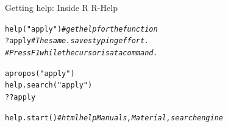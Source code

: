 \documentclass[xcolor=table,       handout,    xcolor=dvipsnames]{beamer}\usepackage[]{graphicx}\usepackage[]{color}
\makeatletter
\newcommand{\hlstr}[1]{\textcolor[rgb]{0.545,0.137,0.137}{#1}}
\newcommand{\hlcom}[1]{\textcolor[rgb]{0,0.392,0}{\textit{#1}}}
\newcommand{\hlopt}[1]{\textcolor[rgb]{0,0,0}{#1}}
\newcommand{\hlstd}[1]{\textcolor[rgb]{0,0,0}{#1}}
\newcommand{\hlkwd}[1]{\textcolor[rgb]{0,0,1}{#1}}
\newenvironment{kframe}{%
 \def\at@end@of@kframe{}%
 \ifinner\ifhmode%
  \def\at@end@of@kframe{\end{minipage}}%
  \begin{minipage}{\columnwidth}%
 \fi\fi%
 \def\FrameCommand##1{\hskip\@totalleftmargin \hskip-\fboxsep
 \colorbox{shadecolor}{##1}\hskip-\fboxsep
     \hskip-\linewidth \hskip-\@totalleftmargin \hskip\columnwidth}%
 \MakeFramed {\advance\hsize-\width
   \@totalleftmargin\z@ \linewidth\hsize
   \@setminipage}}%
 {\par\unskip\endMakeFramed%
 \at@end@of@kframe}
\newenvironment{knitrout}{}{} %
\makeatother
\begin{document}
\begin{frame}[fragile]{Getting help: Inside R}
  R-Help
\begin{knitrout}
\color{fgcolor}\begin{kframe}
\begin{alltt}
\hlkwd{help}\hlstd{(}\hlstr{"apply"}\hlstd{)} \hlcom{# get help for the function}
\hlopt{?}\hlstd{apply} \hlcom{# The same. saves typing effort.}
\hlcom{# Press F1 while the cursor is at a command.}

\hlkwd{apropos}\hlstd{(}\hlstr{"apply"}\hlstd{)}
\hlkwd{help.search}\hlstd{(}\hlstr{"apply"}\hlstd{)}
\hlopt{??}\hlstd{apply}

\hlkwd{help.start}\hlstd{()} \hlcom{# html help Manuals, Material, search engine}
\end{alltt}
\end{kframe}
\end{knitrout}
\end{frame}

\end{document}
